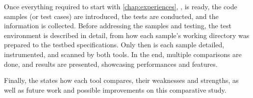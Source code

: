 Once everything required to start with \cref{chap:experiences}, , is ready, the code samples (or test cases) are introduced, the tests are conducted, and the information is collected. Before addressing the samples and testing, the test environment is described in detail, from how each sample's working directory was prepared to the testbed specifications. Only then is each sample detailed, instrumented, and scanned by both tools. In the end, multiple comparisons are done, and results are presented, showcasing performances and features.

Finally, the  states how each tool compares, their weaknesses and strengths, as well as future work and possible improvements on this comparative study.
